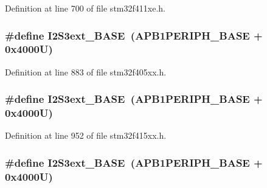 Definition at line 700 of file stm32f411xe.\+h.

\subsubsection[{\texorpdfstring{I2\+S3ext\+\_\+\+B\+A\+SE}{I2S3ext_BASE}}]{\setlength{\rightskip}{0pt plus 5cm}\#define I2\+S3ext\+\_\+\+B\+A\+SE~({\bf A\+P\+B1\+P\+E\+R\+I\+P\+H\+\_\+\+B\+A\+SE} + 0x4000\+U)}\hypertarget{group___peripheral__registers__structures_ga89b61d6e6b09e94f3fccb7bef34e0263}{}\label{group___peripheral__registers__structures_ga89b61d6e6b09e94f3fccb7bef34e0263}


Definition at line 883 of file stm32f405xx.\+h.

\subsubsection[{\texorpdfstring{I2\+S3ext\+\_\+\+B\+A\+SE}{I2S3ext_BASE}}]{\setlength{\rightskip}{0pt plus 5cm}\#define I2\+S3ext\+\_\+\+B\+A\+SE~({\bf A\+P\+B1\+P\+E\+R\+I\+P\+H\+\_\+\+B\+A\+SE} + 0x4000\+U)}\hypertarget{group___peripheral__registers__structures_ga89b61d6e6b09e94f3fccb7bef34e0263}{}\label{group___peripheral__registers__structures_ga89b61d6e6b09e94f3fccb7bef34e0263}


Definition at line 952 of file stm32f415xx.\+h.

\subsubsection[{\texorpdfstring{I2\+S3ext\+\_\+\+B\+A\+SE}{I2S3ext_BASE}}]{\setlength{\rightskip}{0pt plus 5cm}\#define I2\+S3ext\+\_\+\+B\+A\+SE~({\bf A\+P\+B1\+P\+E\+R\+I\+P\+H\+\_\+\+B\+A\+SE} + 0x4000\+U)}\hypertarget{group___peripheral__registers__structures_ga89b61d6e6b09e94f3fccb7bef34e0263}{}\label{group___peripheral__registers__structures_ga89b61d6e6b09e94f3fccb7bef34e0263}


